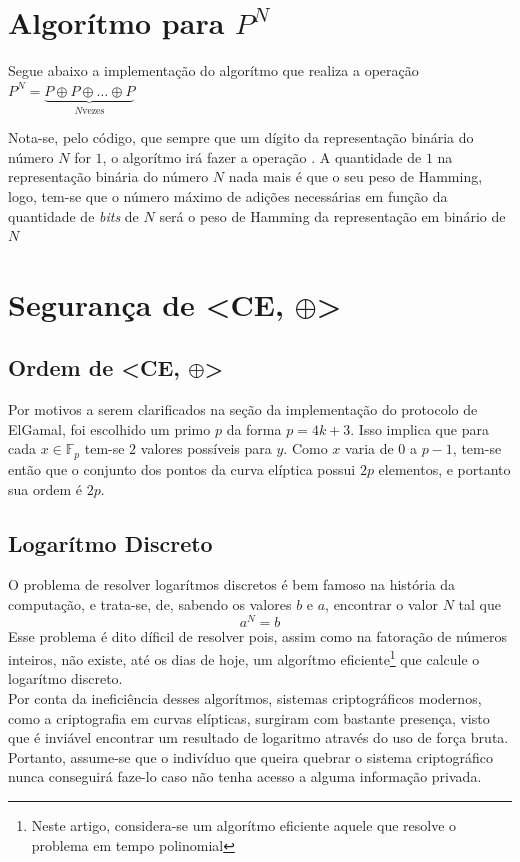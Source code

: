 \documentclass[14pt, oneside]{book}
\newcommand\tab[1][1cm]{\hspace*{#1}}
\theoremstyle{definition}
\begin{document}
            \section{Algorítmo para $P^N$}
                \tab Segue abaixo a implementação do algorítmo que realiza a operação $P^N=\underbrace{P\oplus P\oplus \ldots \oplus  P}_{N\text{vezes}}$
                
                
                Nota-se, pelo código, que sempre que um dígito da representação binária do número $N$ for $1$, o algorítmo irá fazer a operação . A quantidade de $1$ na representação binária do número $N$ nada mais é que o seu peso de Hamming, logo, tem-se que o número máximo de adições necessárias em função da quantidade de \textit{bits} de $N$ será o peso de Hamming da representação em binário de $N$
                
            \section{Segurança de <CE, $\oplus$>}
                \subsection{Ordem de <CE, $\oplus$>}
                    \tab Por motivos a serem clarificados na seção da implementação do protocolo de ElGamal, foi escolhido um primo $p$ da forma $p=4k+3$. Isso implica que para cada $x \in \mathbb{F}_p$ tem-se $2$ valores possíveis para $y$. Como $x$ varia de $0$ a $p-1$, tem-se então que o conjunto dos pontos da curva elíptica possui $2p$ elementos, e portanto sua ordem é $2p$.
                    
                \subsection{Logarítmo Discreto}
                    \tab O problema de resolver logarítmos discretos é bem famoso na história da computação, e trata-se, de, sabendo os valores $b$ e $a$, encontrar o valor $N$ tal que
                    $$a^N = b$$
                    \tab Esse problema é dito díficil de resolver pois, assim como na fatoração de números inteiros, não existe, até os dias de hoje, um algorítmo eficiente\footnote{Neste artigo, considera-se um algorítmo eficiente aquele que resolve o problema em tempo polinomial}  que calcule o logarítmo discreto. \\
                    \tab Por conta da ineficiência desses algorítmos, sistemas criptográficos modernos, como a criptografia em curvas elípticas, surgiram com bastante presença, visto que é inviável encontrar um resultado de logaritmo através do uso de força bruta. Portanto, assume-se que o indivíduo que queira quebrar o sistema criptográfico nunca conseguirá faze-lo caso não tenha acesso a alguma informação privada.
                    
\end{document}
